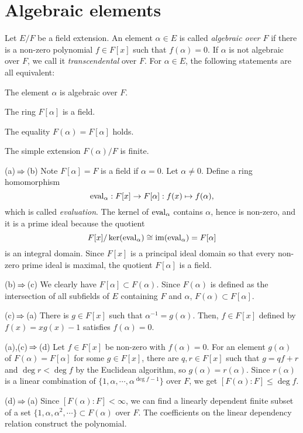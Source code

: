 \documentclass{../note}
\begin{document}
\section{Algebraic elements}
\begin{prb}
Let $E/F$ be a field extension.
An element $\alpha\in E$ is called \emph{algebraic over $F$} if there is a non-zero polynomial $f\in F[x]$ such that $f(\alpha)=0$.
If $\alpha$ is not algebraic over $F$, we call it \emph{transcendental} over $F$.
For $\alpha\in E$, the following statements are all equivalent:
\begin{parts}
\item The element $\alpha$ is algebraic over $F$.
\item The ring $F[\alpha]$ is a field.
\item The equality $F(\alpha)=F[\alpha]$ holds.
\item The simple extension $F(\alpha)/F$ is finite.
\end{parts}
\end{prb}
\begin{pf}
(a)$\impl$(b)
Note $F[\alpha]=F$ is a field if $\alpha=0$.
Let $\alpha\ne0$.
Define a ring homomorphism
\[\operatorname{eval}_\alpha:F[x]\to F[\alpha]:f(x)\mapsto f(\alpha),\]
which is called \emph{evaluation}.
The kernel of $\operatorname{eval}_\alpha$ contains $\alpha$, hence is non-zero, and it is a prime ideal because the quotient
\[F[x]/\ker(\operatorname{eval}_\alpha)\cong\operatorname{im}(\operatorname{eval}_\alpha)=F[\alpha]\]
is an integral domain.
Since $F[x]$ is a principal ideal domain so that every non-zero prime ideal is maximal, the quotient $F[\alpha]$ is a field.

(b)$\impl$(c)
We clearly have $F[\alpha]\subset F(\alpha)$.
Since $F(\alpha)$ is defined as the intersection of all subfields of $E$ containing $F$ and $\alpha$, $F(\alpha)\subset F[\alpha]$.

(c)$\impl$(a)
There is $g\in F[x]$ such that $\alpha^{-1}=g(\alpha)$.
Then, $f\in F[x]$ defined by $f(x)=xg(x)-1$ satisfies $f(\alpha)=0$.

(a),(c)$\impl$(d)
Let $f\in F[x]$ be non-zero with $f(\alpha)=0$.
For an element $g(\alpha)$ of $F(\alpha)=F[\alpha]$ for some $g\in F[x]$, there are $q,r\in F[x]$ such that $g=qf+r$ and $\deg r<\deg f$ by the Euclidean algorithm, so $g(\alpha)=r(\alpha)$.
Since $r(\alpha)$ is a linear combination of $\{1,\alpha,\cdots,\alpha^{\deg f-1}\}$ over $F$, we get $[F(\alpha):F]\le\deg f$.

(d)$\impl$(a)
Since $[F(\alpha):F]<\infty$, we can find a linearly dependent finite subset of a set $\{1,\alpha,\alpha^2,\cdots\}\subset F(\alpha)$ over $F$.
The coefficients on the linear dependency relation construct the polynomial.
\end{pf}
\end{document}
